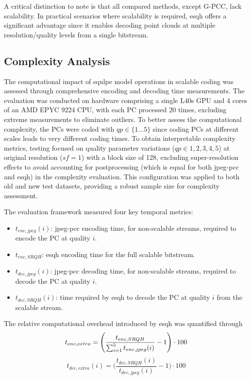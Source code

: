 A critical distinction to note is that all compared methods, except G-PCC, lack scalability. In practical scenarios where scalability is required, \gls{esqh} offers a significant advantage since it enables decoding point clouds at multiple resolution/quality levels from a single bitstream.


\subsection{Complexity Analysis}

The computational impact of \gls{squlpe} model operations in scalable coding was assessed through comprehensive encoding and decoding time measurements. The evaluation was conducted on hardware comprising a single L40s GPU and 4 cores of an AMD EPYC 9224 CPU, with each PC processed 20 times, excluding extreme measurements to eliminate outliers.
To better assess the computational complexity, the PCs were coded with $qp \in \{1\dots5\}$ since coding PCs at different scales leads to very different coding times.
To obtain interpretable complexity metrics, testing focused on quality parameter variations ($qp \in {1, 2, 3, 4, 5}$) at original resolution ($sf=1$) with a block size of 128, excluding super-resolution effects to avoid accounting for postprocessing (which is equal for both \gls{jpeg-pcc} and \gls{esqh}) in the complexity evaluation.
This configuration was applied to both old and new test datasets, providing a robust sample size for complexity assessment. 

The evaluation framework measured four key temporal metrics:
\begin{itemize}
    \item $t_{enc, jpeg}(i)$: \gls{jpeg-pcc} encoding time, for non-scalable streams, required to encode the PC at quality $i$.
    \item $t_{enc, SRQH}$: \gls{esqh} encoding time for the full scalable bitstream.
    \item $t_{dec, jpeg}(i)$: \gls{jpeg-pcc} decoding time, for non-scalable streams, required to decode the PC at quality $i$.
    \item $t_{dec, SRQH}(i)$: time required by \gls{esqh} to decode the PC at quality $i$ from the scalable stream.
\end{itemize}

The relative computational overhead introduced by \gls{esqh} was quantified through
\begin{equation}
    t_{enc, extra} = \Bigg(\frac{t_{enc, SRQH}}{\sum_{i=1}^{5} t_{enc, jpeg}(i)} - 1\Bigg) \cdot 100 \\ 
\end{equation}
\begin{equation}
    t_{dec, extra}(i) = \Bigg(\frac{t_{dec, SRQH}(i)}{t_{dec, jpeg}(i)} - 1\Bigg) \cdot 100
\end{equation}

